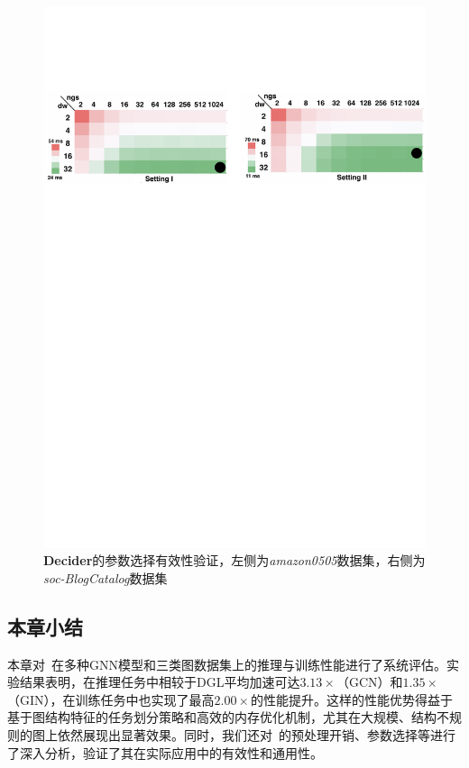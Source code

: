 \begin{figure}[htbp] 
    \centering
    \includegraphics[width=0.9\linewidth]{images/paramer-2.pdf} 
    \caption{\textbf{Decider}的参数选择有效性验证，左侧为\textit{amazon0505}数据集，右侧为\textit{soc-BlogCatalog}数据集}
    \label{fig: parameter selection}
    \setlength{\abovecaptionskip}{0.4cm} %
    \setlength{\belowcaptionskip}{-0.4cm} %
\end{figure} 
\subsection{本章小结}
本章对~\Mname{}在多种GNN模型和三类图数据集上的推理与训练性能进行了系统评估。实验结果表明，\Mname{}在推理任务中相较于DGL平均加速可达$3.13\times$（GCN）和$1.35\times$（GIN），在训练任务中也实现了最高$2.00\times$的性能提升。这样的性能优势得益于\Mname{}基于图结构特征的任务划分策略和高效的内存优化机制，尤其在大规模、结构不规则的图上依然展现出显著效果。同时，我们还对~\Mname{}的预处理开销、参数选择等进行了深入分析，验证了其在实际应用中的有效性和通用性。


